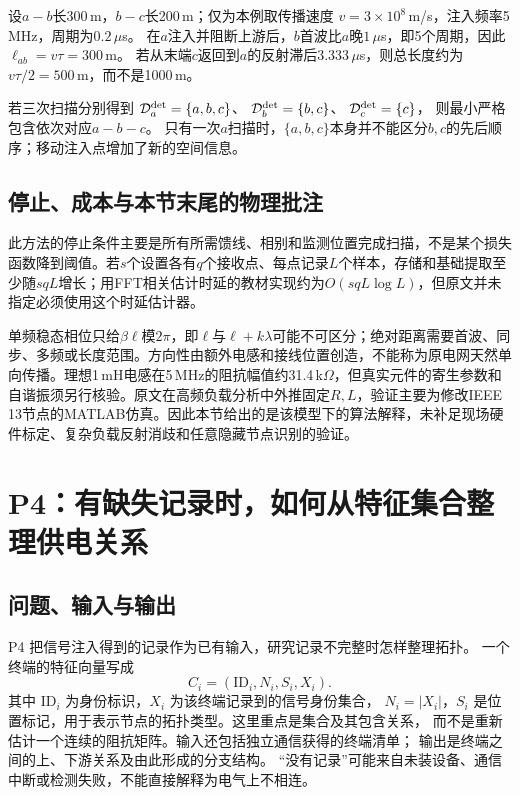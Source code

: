 \begin{example}
设$a-b$长300\,m，$b-c$长200\,m；仅为本例取传播速度
$v=3\times10^8$\,m/s，注入频率5\,MHz，周期为$0.2\,\mu$s。
在$a$注入并阻断上游后，$b$首波比$a$晚$1\,\mu$s，即5个周期，因此
$\ell_{ab}=v\tau=300$\,m。
若从末端$c$返回到$a$的反射滞后$3.333\,\mu$s，则总长度约为
$v\tau/2=500$\,m，而不是1000\,m。

若三次扫描分别得到
$\mathcal D_a^{\rm det}=\{a,b,c\}$、
$\mathcal D_b^{\rm det}=\{b,c\}$、
$\mathcal D_c^{\rm det}=\{c\}$，
则最小严格包含依次对应$a-b-c$。
只有一次$a$扫描时，$\{a,b,c\}$本身并不能区分$b,c$的先后顺序；移动注入点增加了新的空间信息。
\end{example}

\subsection{停止、成本与本节末尾的物理批注}

此方法的停止条件主要是所有所需馈线、相别和监测位置完成扫描，不是某个损失函数降到阈值。若$s$个设置各有$q$个接收点、每点记录$L$个样本，存储和基础提取至少随$sqL$增长；用FFT相关估计时延的教材实现约为$O(sqL\log L)$，但原文并未指定必须使用这个时延估计器。

单频稳态相位只给$\beta\ell$模$2\pi$，即$\ell$与$\ell+k\lambda$可能不可区分；绝对距离需要首波、同步、多频或长度范围。方向性由额外电感和接线位置创造，不能称为原电网天然单向传播。理想1\,mH电感在5\,MHz的阻抗幅值约31.4\,k$\Omega$，但真实元件的寄生参数和自谐振须另行核验。原文在高频负载分析中外推固定$R,L$，验证主要为修改IEEE 13节点的MATLAB仿真。因此本节给出的是该模型下的算法解释，未补足现场硬件标定、复杂负载反射消歧和任意隐藏节点识别的验证。


\section{P4：有缺失记录时，如何从特征集合整理供电关系}\label{sec:tb-P4}

\subsection{问题、输入与输出}
P4 把信号注入得到的记录作为已有输入，研究记录不完整时怎样整理拓扑。\citep{P4}
一个终端的特征向量写成
\[
 C_i=(\mathrm{ID}_i,N_i,S_i,X_i).
\]
其中 $\mathrm{ID}_i$ 为身份标识，$X_i$ 为该终端记录到的信号身份集合，
$N_i=|X_i|$，$S_i$ 是位置标记，用于表示节点的拓扑类型。这里重点是集合及其包含关系，
而不是重新估计一个连续的阻抗矩阵。输入还包括独立通信获得的终端清单；
输出是终端之间的上、下游关系及由此形成的分支结构。
“没有记录”可能来自未装设备、通信中断或检测失败，不能直接解释为电气上不相连。

